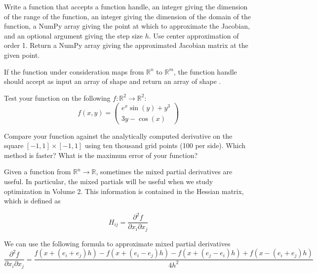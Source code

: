 \begin{problem}
Write a function  that accepts a function handle, an integer giving the dimension of the
range of the function, an integer giving the dimension of the domain of the function, a NumPy array giving
the point at which to approximate the Jacobian, and an optional argument giving the step size $h$. Use center approximation of order 1.
Return a NumPy array giving the approximated Jacobian matrix at the given point.

If the function under consideration maps from $\mathbb{R}^n$ to $\mathbb{R}^m$, the function handle should
accept as input an array of shape  and return an array of shape .

Test your function on the following $f: \mathbb{R}^2 \to \mathbb{R}^2$:
\begin{equation*}
f(x, y) =
\begin{pmatrix}
e^{x} \sin(y) + y^3 \\
3y - \cos(x)
\end{pmatrix}
\end{equation*}

Compare your  function against the analytically computed derivative on the square $[-1,1] \times [-1,1]$ using ten thousand grid points (100 per side). Which method is faster? What is the maximum error of your function?
\end{problem}

Given a function from $\mathbb{R}^n \to \mathbb{R}$, sometimes the mixed partial derivatives are useful. In particular, the mixed partials will be useful when we study optimization in Volume 2. This information is contained in the Hessian matrix, which is defined as

\begin{equation*}
H_{ij} = \frac{\partial^2 f}{\partial x_i \partial x_j}
\end{equation*}

We can use the following formula to approximate mixed partial derivatives
\small
\begin{equation*}
\frac{\partial^2 f}{\partial x_i \partial x_j} = \frac{f(x + (e_i + e_j)h) - f(x + (e_i-e_j)h) -f(x + (e_j-e_i)h) + f(x - (e_i + e_j)h)}{4h^2}
\end{equation*}
\normalsize

